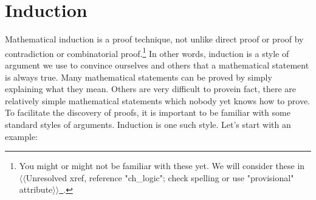 \documentclass[10pt,]{book}
\theoremstyle{plain}
\theoremstyle{definition}
\theoremstyle{definition}
\theoremstyle{definition}
\theoremstyle{definition}
\numberwithin{equation}{chapter}
\begin{document}
\section[{Induction}]{Induction}\label{sec_seq-induction}
\hypertarget{p-2195}{}%
 Mathematical induction is a proof technique, not unlike direct proof or proof by contradiction or combinatorial proof.\footnote{You might or might not be familiar with these yet.  We will consider these in {$\langle\langle$Unresolved xref, reference "ch\_logic"; check spelling or use "provisional" attribute$\rangle\rangle$}\hyperlink{}{~}.\label{fn-12}} In other words, induction is a style of argument we use to convince ourselves and others that a mathematical statement is always true. Many mathematical statements can be proved by simply explaining what they mean. Others are very difficult to prove\textemdash{}in fact, there are relatively simple mathematical statements which nobody yet knows how to prove. To facilitate the discovery of proofs, it is important to be familiar with some standard styles of arguments. Induction is one such style. Let's start with an example:%
\typeout{************************************************}
\typeout{************************************************}
\end{document}
